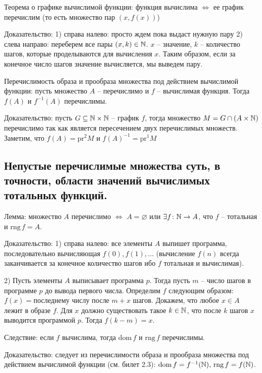 \documentclass[a4paper, 10pt]{article}
\newcommand{\dom}{\text{dom}\,}
\newcommand{\rng}{\text{rng}\,}
\begin{document}
Теорема о графике вычислимой функции: функция вычислима $\iff$ ее график перечислим (то есть множество пар $(x,f(x))$)

Доказательство: 1) справа налево: просто ждем пока выдаст нужную пару
2) слева направо: переберем все пары $(x,k)\in\mathbb{N}$. $x$ -- значение, $k$ -- количество шагов, которые проделываются для вычисления $x$. Таким образом, если за конечное число шагов значение вычисляется, мы выведем пару.

\hfill

Перечислимость образа и прообраза множества под действием вычислимой функции: пусть множество $A$ -- перечислимо и $f$ -- вычислимая функция. Тогда $f(A)$ и $f^{-1}(A)$ перечислимы.

Доказательство: пусть $G\subseteq\mathbb{N}\times\mathbb{N}$ -- график $f$, тогда множество $M=G\cap(A\times\mathbb{N})$ перечислимо так как является пересечением двух перечислимых множеств. Заметим, что $f(A)=\text{pr}^2 M$ и $f(A)^{-1}=\text{pr}^1 M$

\subsection{Непустые перечислимые множества суть, в точности, области значений вычислимых тотальных функций.}

Лемма: множество $A$ перечислимо $\iff$ $A=\varnothing$ или $\exists f\colon \mathbb{N}\to A$, что $f$ -- тотальная и $\text{rng}\, f=A$.

Доказательство: 1) справа налево: все элементы $A$ выпишет программа, последовательно вычисляющая $f(0),f(1),\ldots$ (вычисление $f(n)$ всегда заканчивается за конечное количество шагов ибо $f$ тотальная и вычислимая).

2) Пусть элементы $A$ выписывает программа $p$. Тогда пусть $m$ -- число шагов в программе $p$ до вывода первого числа. Определим $f$ следующим образом: $f(x)=$последнему числу после $m+x$ шагов. Докажем, что любое $x\in A$ лежит в образе $f$. Для $x$ должно существовать такое $k\in\mathbb{N}$, что после $k$ шагов $x$ выводится программой $p$. Тогда $f(k-m)=x$.

\hfill

Следствие: если $f$ вычислима, тогда $\dom f$ и $\rng f$ перечислимы.

Доказательство: следует из перечислимости образа и прообраза множества под действием вычислимой функции (см. билет 2.3): $\dom f=f^{-1}(\N),\,\rng f=f(\N)$.
\end{document}
